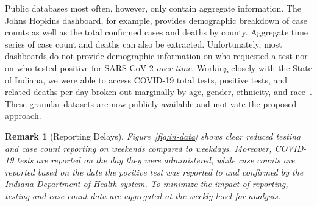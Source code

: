 \documentclass[11pt]{amsart}
\numberwithin{equation}{section}
\theoremstyle{plain}
\newtheorem{remark}{Remark}
\begin{document}
 Public databases most often, however, only contain aggregate information.  The Johns Hopkins dashboard, for example, provides demographic breakdown of case counts as well as the total confirmed cases and deaths by county.  Aggregate time series of case count and deaths can also be extracted.  Unfortunately, most dashboards do not provide demographic information on who requested a test nor on who tested positive for SARS-CoV-2 \emph{over time}. Working closely with the State of Indiana, we were able to access COVID-19 total tests, positive tests, and related deaths per day broken out marginally by age, gender, ethnicity, and race~\citep{IndianaData2021}.  These granular datasets are now publicly available and motivate the proposed approach.

\begin{remark}[Reporting Delays]
Figure~\ref{fig:in-data} shows clear reduced testing and case count reporting on weekends compared to weekdays. Moreover, COVID-19 tests are reported on the day they were administered, while case counts are reported based on the date the positive test was reported to and confirmed by the Indiana Department of Health system.  To minimize the impact of reporting, testing and case-count data are aggregated at the weekly level for analysis.
 \end{remark}


\end{document}
